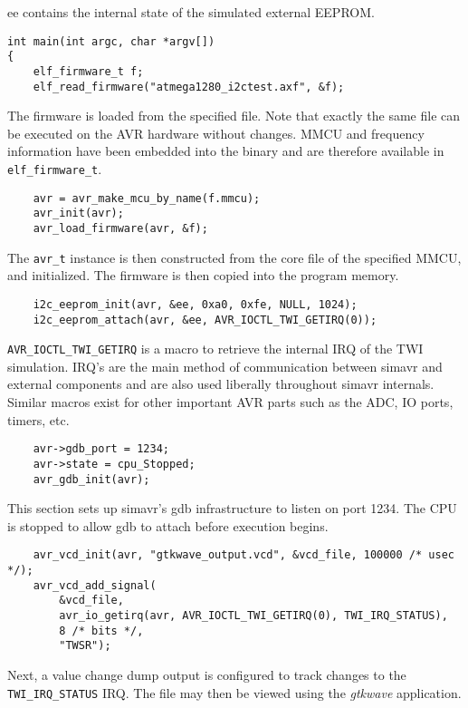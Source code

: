 ee contains the internal state of the simulated external EEPROM.

\begin{lstlisting}
int main(int argc, char *argv[])
{
    elf_firmware_t f;
    elf_read_firmware("atmega1280_i2ctest.axf", &f);
\end{lstlisting}

The firmware is loaded from the specified file. Note that exactly the same file
can be executed on the AVR hardware without changes. MMCU and frequency
information have been embedded into the binary and are therefore available in
\lstinline|elf_firmware_t|.

\begin{lstlisting}
    avr = avr_make_mcu_by_name(f.mmcu);
    avr_init(avr);
    avr_load_firmware(avr, &f);
\end{lstlisting}

The \lstinline|avr_t| instance is then constructed from the core file of the specified
MMCU, and initialized. The firmware is then copied into the program memory.

\begin{lstlisting}
    i2c_eeprom_init(avr, &ee, 0xa0, 0xfe, NULL, 1024);
    i2c_eeprom_attach(avr, &ee, AVR_IOCTL_TWI_GETIRQ(0));
\end{lstlisting}

\lstinline|AVR_IOCTL_TWI_GETIRQ| is a macro to retrieve the internal IRQ of the TWI
simulation. IRQ's are the main method of communication between simavr and
external components and are also used liberally throughout simavr internals.
Similar macros exist for other important AVR parts such as the ADC, IO ports,
timers, etc.

\begin{lstlisting}
    avr->gdb_port = 1234;
    avr->state = cpu_Stopped;
    avr_gdb_init(avr);
\end{lstlisting}

This section sets up simavr's gdb infrastructure to listen on port 1234. The
CPU is stopped to allow gdb to attach before execution begins.

\begin{lstlisting}
    avr_vcd_init(avr, "gtkwave_output.vcd", &vcd_file, 100000 /* usec */);
    avr_vcd_add_signal(
        &vcd_file,
        avr_io_getirq(avr, AVR_IOCTL_TWI_GETIRQ(0), TWI_IRQ_STATUS),
        8 /* bits */,
        "TWSR");
\end{lstlisting}

Next, a value change dump output is configured to track changes to the
\lstinline|TWI_IRQ_STATUS| IRQ. The file may then be viewed using the \emph{gtkwave}
application.

